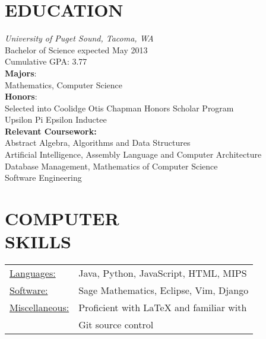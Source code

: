 \documentclass[line,margin,11pt]{res}
\begin{document}
\address{2214 N. Washington Street, Tacoma, WA 98406} 
\address{kwenholz@pugetsound.edu\hspace*{2mm} \vline \hspace*{2mm} (406)546-9210}

 
\begin{resume}
\vspace*{.3cm}

\section{EDUCATION} {\sl University of Puget Sound, Tacoma, WA} \\
                Bachelor of Science
                expected May 2013 \\
                Cumulative GPA: 3.77\\
                \textbf{Majors}: \\
\hspace*{5mm}                Mathematics, Computer Science \\
                \textbf{Honors}:\\
\hspace*{5mm}   Selected into Coolidge Otis Chapman Honors Scholar Program\\
\hspace*{5mm}   Upsilon Pi Epsilon Inductee\\
                \textbf{Relevant Coursework:}\\ 
\hspace*{5mm}                   Abstract Algebra, Algorithms and Data Structures\\
\hspace*{5mm}                   Artificial Intelligence, Assembly Language and Computer Architecture\\
\hspace*{5mm}                   Database Management, Mathematics of Computer Science\\
\hspace*{5mm}                   Software Engineering 
      
\vspace*{.2cm}

\section{COMPUTER \\ SKILLS}
\begin{tabular}{l l}
   \underline{Languages:} & Java, Python, JavaScript, HTML, MIPS\\
   \underline{Software:} & Sage Mathematics, Eclipse, Vim, Django\\
   \underline{Miscellaneous:} & Proficient with LaTeX and familiar with\\
        & Git source control
  \end{tabular}


\end{resume}
\end{document}
